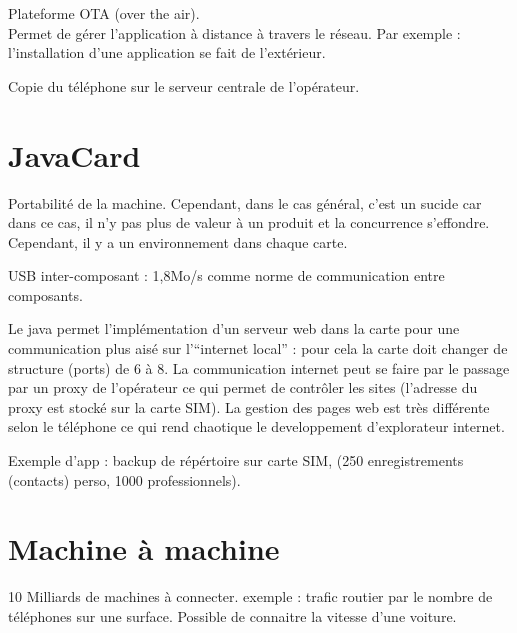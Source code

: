 \documentclass[a4paper,12pt]{article}
\begin{document}
Plateforme OTA (over the air).\\

Permet de gérer l'application à distance à travers le réseau. Par exemple : l'installation d'une application se fait de l'extérieur.

Copie du téléphone sur le serveur centrale de l'opérateur.

\section{JavaCard}

Portabilité de la machine. Cependant, dans le cas général, c'est un sucide car dans ce cas, il n'y pas plus de valeur à un produit et la concurrence s'effondre.
Cependant, il y a un environnement dans chaque carte. 

USB inter-composant : 1,8Mo/s comme norme de communication entre composants.

Le java permet l'implémentation d'un serveur web dans la carte pour une communication plus aisé sur l'``internet local'' : pour cela la carte doit changer de structure (ports) de 6 à 8. La communication internet peut se faire par le passage par un proxy de l'opérateur ce qui permet de contrôler les sites (l'adresse du proxy est stocké sur la carte SIM). La gestion des pages web est très différente selon le téléphone ce qui rend chaotique le developpement d'explorateur internet.

Exemple d'app : backup de répértoire sur carte SIM, (250 enregistrements (contacts) perso, 1000 professionnels).

\section{Machine à machine}

10 Milliards de machines à connecter. 
exemple : trafic routier par le nombre de téléphones sur une surface. Possible de connaitre la vitesse d'une voiture.
\end{document}
